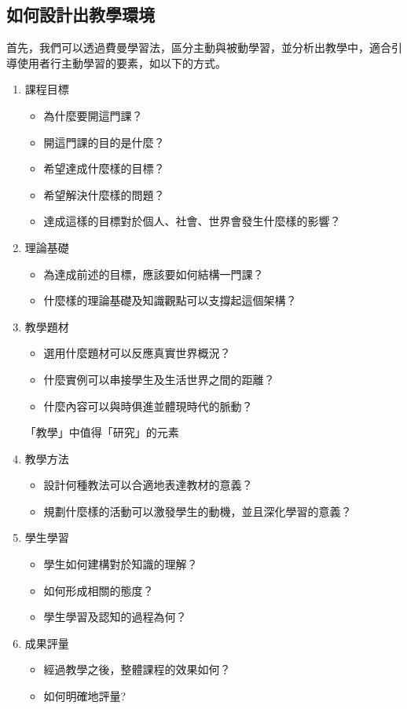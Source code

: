 \subsection{如何設計出教學環境}
\par
\renewcommand{\baselinestretch}{1} %
\twelve \qquad 首先，我們可以透過費曼學習法，區分主動與被動學習，並分析出教學中，適合引導使用者行主動學習的要素，如以下的方式。
\begin{enumerate}
	\item 課程目標
	\begin{itemize}
		\item 為什麼要開這門課？
		\item 開這門課的目的是什麼？
		\item 希望達成什麼樣的目標？
		\item 希望解決什麼樣的問題？
		\item 達成這樣的目標對於個人、社會、世界會發生什麼樣的影響？
	\end{itemize}
	\item 理論基礎
	\begin{itemize}
		\item 為達成前述的目標，應該要如何結構一門課？
		\item 什麼樣的理論基礎及知識觀點可以支撐起這個架構？
	\end{itemize}
	\item 教學題材
	\begin{itemize}
		\item 選用什麼題材可以反應真實世界概況？
		\item 什麼實例可以串接學生及生活世界之間的距離？
		\item 什麼內容可以與時俱進並體現時代的脈動？
	\end{itemize}
「教學」中值得「研究」的元素
	\item 教學方法
	\begin{itemize}
		\item 設計何種教法可以合適地表達教材的意義？
		\item 規劃什麼樣的活動可以激發學生的動機，並且深化學習的意義？
	\end{itemize}
	\item 學生學習
	\begin{itemize}
		\item 學生如何建構對於知識的理解？
		\item 如何形成相關的態度？
		\item 學生學習及認知的過程為何？
	\end{itemize}
	\item 成果評量
	\begin{itemize}
		\item 經過教學之後，整體課程的效果如何？
		\item 如何明確地評量?
	\end{itemize}
\end{enumerate}
\par

